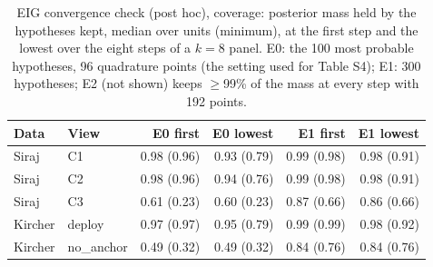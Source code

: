 \begin{table}[H]
\caption{EIG convergence check (post hoc), coverage: posterior mass held by the hypotheses kept, median over units (minimum), at the first step and the lowest over the eight steps of a $k=8$ panel. E0: the 100 most probable hypotheses, 96 quadrature points (the setting used for Table S4); E1: 300 hypotheses; E2 (not shown) keeps $\ge$99\% of the mass at every step with 192 points.}\label{tab:s6a}
\centering\small
\begin{tabular}{llrrrr}
\toprule
Data & View & E0 first & E0 lowest & E1 first & E1 lowest \\
\midrule
Siraj & C1 & 0.98 (0.96) & 0.93 (0.79) & 0.99 (0.98) & 0.98 (0.91) \\
Siraj & C2 & 0.98 (0.96) & 0.94 (0.76) & 0.99 (0.98) & 0.98 (0.91) \\
Siraj & C3 & 0.61 (0.23) & 0.60 (0.23) & 0.87 (0.66) & 0.86 (0.66) \\
Kircher & deploy & 0.97 (0.97) & 0.95 (0.79) & 0.99 (0.99) & 0.98 (0.92) \\
Kircher & no\_anchor & 0.49 (0.32) & 0.49 (0.32) & 0.84 (0.76) & 0.84 (0.76) \\
\bottomrule
\end{tabular}
\end{table}

\addtocounter{table}{-1}\renewcommand{\thetable}{S6b}


